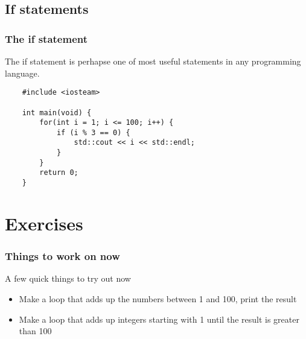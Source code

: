 \documentclass{beamer}
\begin{document}
\subsection{If statements}

\begin{frame}[fragile]
	\frametitle{The if statement}
	The if statement is perhapse one of most useful statements in any programming language.
	
	\begin{lstlisting}
	#include <iosteam>

	int main(void) {
	    for(int i = 1; i <= 100; i++) {
	        if (i % 3 == 0) {
	            std::cout << i << std::endl;
	        }
	    }
	    return 0;
	}
	\end{lstlisting}
\end{frame}

\section{Exercises}

\begin{frame}
	\frametitle{Things to work on now}
	A few quick things to try out now
	\begin{itemize}
		\item Make a loop that adds up the numbers between 1 and 100, print the result
		\item Make a loop that adds up integers starting with 1 until the result is greater than 100
	\end{itemize}
\end{frame}
\end{document}
